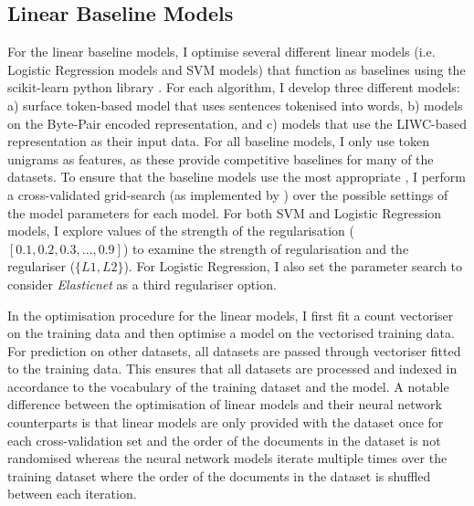 \subsection{Linear Baseline Models}\label{sec:baseline_models}
For the linear baseline models, I optimise several different linear models (i.e. Logistic Regression models and SVM models) that function as baselines using the scikit-learn python library \citet{Pedregosa:2011}.
For each algorithm, I develop three different models: a) surface token-based model that uses sentences tokenised into words, b) models on the Byte-Pair encoded representation, and c) models that use the LIWC-based representation as their input data.
For all baseline models, I only use token unigrams as features, as these provide competitive baselines for many of the datasets.
To ensure that the baseline models use the most appropriate , I perform a cross-validated grid-search (as implemented by \citet{Pedregosa:2011}) over the possible settings of the model parameters for each model.
For both SVM and Logistic Regression models, I explore values of the strength of the regularisation ($[0.1, 0.2, 0.3, \ldots, 0.9]$) to examine the strength of regularisation and the regulariser ($\{L1, L2\}$).
For Logistic Regression, I also set the parameter search to consider \textit{Elasticnet} as a third regulariser option.

In the optimisation procedure for the linear models, I first fit a count vectoriser on the training data and then optimise a model on the vectorised training data.
For prediction on other datasets, all datasets are passed through vectoriser  fitted to the training data.
This ensures that all datasets are processed and indexed in accordance to the vocabulary of the training dataset and the model.
A notable difference between the optimisation of linear models and their neural network counterparts is that linear models are only provided with the dataset once for each cross-validation set and the order of the documents in the dataset is not randomised whereas the neural network models iterate multiple times over the training dataset where the order of the documents in the dataset is  shuffled between each iteration.

